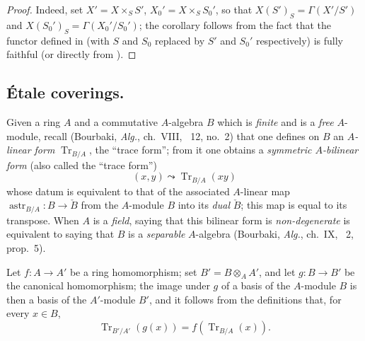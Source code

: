 \begin{proof}
Indeed, set $X'=X\times_S S'$, $X_0'=X\times_S S_0'$, so that $X(S')_S=\Gamma(X'/S')$ and $X(S_0')_S=\Gamma(X_0'/S_0')$;
the corollary follows from the fact that the functor defined in  (with $S$ and $S_0$ replaced by $S'$ and $S_0'$ respectively) is fully faithful (or directly from ).
\end{proof}

\subsection{\'Etale coverings.}
\label{subsection:IV.18.2}


\begin{env}[18.2.1]
\label{IV.18.2.1}
Given a ring $A$ and a commutative $A$-algebra $B$ which is \emph{finite} and is a \emph{free} $A$-module, recall (Bourbaki, \emph{Alg.}, ch.~VIII, \textsection~12, no.~2) that one defines on $B$ an \emph{$A$-linear form} $\operatorname{Tr}_{B/A}$, the ``trace form''; from it one obtains a \emph{symmetric $A$-bilinear form} (also called the ``trace form'')
\[
\label{IV.18.2.1.1}
(x,y)\leadsto\operatorname{Tr}_{B/A}(xy)
\tag{18.2.1.1}
\]
whose datum is equivalent to that of the associated $A$-linear map $\operatorname{astr}_{B/A}:B\to\check{B}$ from the $A$-module $B$ into its \emph{dual} $\check{B}$; this map is equal to its transpose.  When $A$ is a \emph{field}, saying that this bilinear form is \emph{non-degenerate} is equivalent to saying that $B$ is a \emph{separable} $A$-algebra (Bourbaki, \emph{Alg.}, ch.~IX, \textsection~2, prop.~5).

Let $f:A\to A'$ be a ring homomorphism;
set $B'=B\otimes_A A'$, and let $g:B\to B'$ be the canonical homomorphism;
the image under $g$ of a basis of the $A$-module $B$ is then a basis of the $A'$-module $B'$, and it follows from the definitions that, for every $x\in B$,
\[
\label{IV.18.2.1.2}
\operatorname{Tr}_{B'/A'}(g(x))=f(\operatorname{Tr}_{B/A}(x)).
\tag{18.2.1.2}
\]
\end{env}

